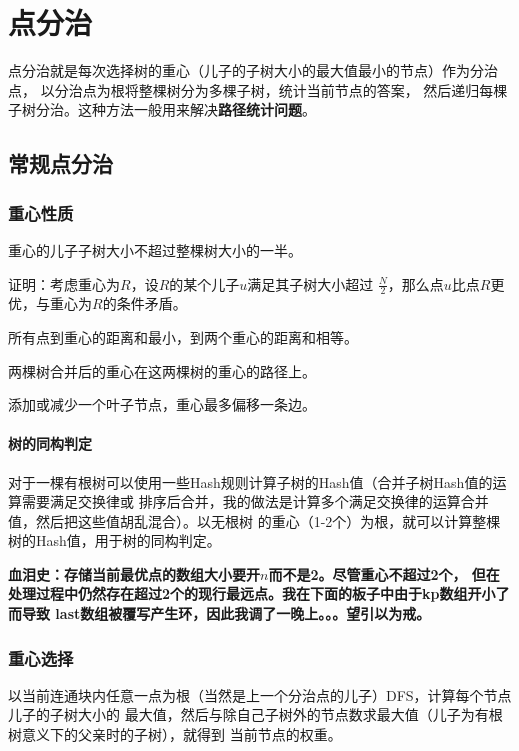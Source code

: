 \section{点分治}
点分治就是每次选择树的重心（儿子的子树大小的最大值最小的节点）作为分治点，
以分治点为根将整棵树分为多棵子树，统计当前节点的答案，
然后递归每棵子树分治。这种方法一般用来解决{\bfseries 路径统计问题}。
\subsection{常规点分治}
\subsubsection{重心性质}
\begin{property}\label{WPP}
    重心的儿子子树大小不超过整棵树大小的一半。
\end{property}
证明：考虑重心为$R$，设$R$的某个儿子$u$满足其子树大小超过
$\frac{N}{2}$，那么点$u$比点$R$更优，与重心为$R$的条件矛盾。
\begin{property}
    所有点到重心的距离和最小，到两个重心的距离和相等。
\end{property}
\begin{property}
    两棵树合并后的重心在这两棵树的重心的路径上。
\end{property}
\begin{property}
    添加或减少一个叶子节点，重心最多偏移一条边。
\end{property}

\paragraph{树的同构判定}
对于一棵有根树可以使用一些Hash规则计算子树的Hash值（合并子树Hash值的运算需要满足交换律或
排序后合并，我的做法是计算多个满足交换律的运算合并值，然后把这些值胡乱混合）。以无根树
的重心（1-2个）为根，就可以计算整棵树的Hash值，用于树的同构判定。

{\bfseries 血泪史：存储当前最优点的数组大小要开$n$而不是2。尽管重心不超过2个，
但在处理过程中仍然存在超过2个的现行最远点。我在下面的板子中由于kp数组开小了而导致
last数组被覆写产生环，因此我调了一晚上。。。望引以为戒。}



\subsubsection{重心选择}
以当前连通块内任意一点为根（当然是上一个分治点的儿子）DFS，计算每个节点儿子的子树大小的
最大值，然后与除自己子树外的节点数求最大值（儿子为有根树意义下的父亲时的子树），就得到
当前节点的权重。

